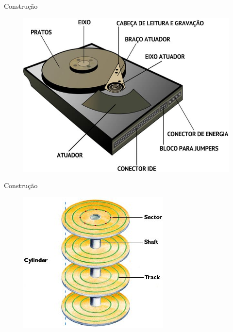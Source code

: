 \documentclass[aspectratio=169,
				xcolor=table]{beamer}
\begin{document}
	\begin{frame}{Construção}
		\begin{figure}
		\centering
		\includegraphics[height=0.8\textheight, keepaspectratio]{../figs/cap08/hd04}
		\end{figure}			
	\end{frame}

	\begin{frame}{Construção}
		\begin{figure}
		\centering
		\includegraphics[height=0.8\textheight, keepaspectratio]{../figs/cap08/hd05}
		\end{figure}			
	\end{frame}
	
\end{document}
